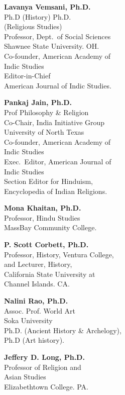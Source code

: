 \begin{multicols}{2}
\begin{trivlist}
\item \textbf{Lavanya Vemsani, Ph.D.}\\ 
Ph.D (History) Ph.D.\\ (Religious Studies)\\
Professor, Dept.\ of Social Sciences\\
Shawnee State University. OH.\\ 
Co-founder, American Academy of\\ Indic Studies\\ 
Editor-in-Chief\\ 
American Journal of Indic Studies.
 
\item \textbf{Pankaj Jain, Ph.D.}\\ 
Prof Philosophy \& Religion\\
Co-Chair, India Initiative Group\\
University of North Texas\\[2pt]
Co-founder, American Academy of\\ Indic Studies\\[2pt]
Exec.\ Editor, American Journal of\\ Indic Studies\\
Section Editor for Hinduism,\\[2pt] 
Encyclopedia of Indian Religions.
 
\item \textbf{Mona Khaitan, Ph.D.}\\ 
Professor, Hindu Studies\\
MassBay Community College.
 
\item \textbf{P. Scott Corbett, Ph.D.}\\ 
Professor, History, Ventura College,\\ 
and Lecturer, History,\\ 
California State University at\\ 
Channel Islands. CA. 
 
\item \textbf{Nalini Rao, Ph.D.}\\ 
Assoc. Prof. World Art\\
Soka University\\
Ph.D. (Ancient History \& Archelogy),\\ Ph.D (Art history).
\vfill
 
\item \textbf{Jeffery D. Long, Ph.D.}\\ 
Professor of Religion and\\ Asian Studies\\
Elizabethtown College. PA.
 

\end{trivlist}
\end{multicols}
